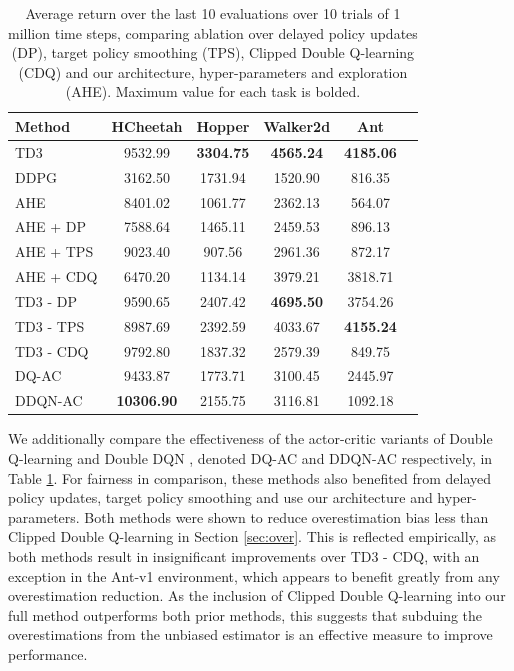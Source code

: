\documentclass{article}
\begin{document}
\begin{table}[ht]
\centering
\caption{Average return over the last 10 evaluations over 10 trials of 1 million time steps, comparing ablation over delayed policy updates (DP), target policy smoothing (TPS), Clipped Double Q-learning (CDQ) and our architecture, hyper-parameters and exploration (AHE). Maximum value for each task is bolded.}
\label{table:ablation}
\begin{center}
\begin{small}
\begin{tabular}{lccccr}
\toprule
\bf{Method} & \bf{HCheetah}&\bf{Hopper}	& \bf{Walker2d} & \bf{Ant} \\
\midrule
TD3 		& 9532.99 		& \bf{3304.75} 	& \bf{4565.24} 	& \bf{4185.06} \\
DDPG		& 3162.50 		& 1731.94 		& 1520.90 		& 816.35 \\
AHE			& 8401.02 		& 1061.77 		& 2362.13 		& 564.07 \\
\midrule
AHE + DP 	& 7588.64 		& 1465.11 		& 2459.53 		& 896.13 \\
AHE + TPS 	& 9023.40 		& 907.56 		& 2961.36 		& 872.17 \\
AHE + CDQ 	& 6470.20 		& 1134.14 		& 3979.21 		& 3818.71 \\
\midrule
TD3 - DP 	& 9590.65		& 2407.42 		& \bf{4695.50} 	& 3754.26 \\
TD3 - TPS 	& 8987.69 		& 2392.59 		& 4033.67 		& \bf{4155.24} \\
TD3 - CDQ 	& 9792.80	  	& 1837.32 		& 2579.39 		& 849.75 \\
\midrule
DQ-AC 		& 9433.87		& 1773.71		& 3100.45 		& 2445.97 \\
DDQN-AC 	& \bf{10306.90}	& 2155.75 		& 3116.81 		& 1092.18 \\
\bottomrule
\end{tabular}
\end{small}
\end{center}
\vskip -0.1in
\end{table}

We additionally compare the effectiveness of the actor-critic variants of Double Q-learning \cite{hasselt2010double} and Double DQN \cite{DoubleDQN}, denoted DQ-AC and DDQN-AC respectively, in Table \ref{table:ablation}. For fairness in comparison, these methods also benefited from delayed policy updates, target policy smoothing and use our architecture and hyper-parameters. Both methods were shown to reduce overestimation bias less than Clipped Double Q-learning in Section \ref{sec:over}. This is reflected empirically, as both methods result in insignificant improvements over TD3 - CDQ, with an exception in the Ant-v1 environment, which appears to benefit greatly from any overestimation reduction. As the inclusion of Clipped Double Q-learning into our full method outperforms both prior methods, this suggests that subduing the overestimations from the unbiased estimator is an effective measure to improve performance. 
\end{document}

